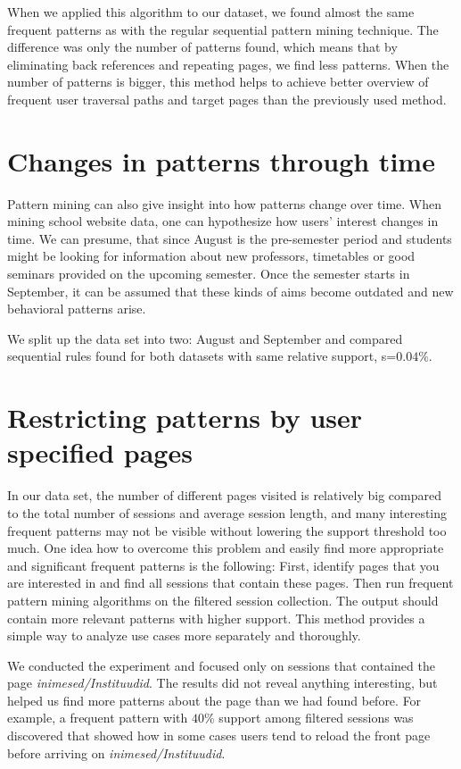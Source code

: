 \documentclass[12pt, english,a4paper]{article}
\begin{document}
When we applied this algorithm to our dataset, we found almost the same frequent patterns as with the regular sequential pattern mining technique. The difference was only the number of patterns found, which means that by eliminating back references and repeating pages, we find less patterns. When the number of patterns is bigger, this method helps to achieve better overview of frequent user traversal paths and target pages than the previously used method.

\section{Changes in patterns through time} 
Pattern mining can also give insight into how patterns change over time. When mining school website data, one can hypothesize how users' interest changes in time. We can presume, that since August is the pre-semester period and students might be looking for information about new professors, timetables or good seminars provided on the upcoming semester. Once the semester starts in September, it can be assumed that these kinds of aims become outdated and new behavioral patterns arise.

We split up the data set into two: August and September and compared sequential rules found for both datasets with same relative support, s=$0.04\%$.


\section{Restricting patterns by user specified pages}

In our data set, the number of different pages visited is relatively big compared to the total number of sessions and average session length, and many interesting frequent patterns may not be visible without lowering the support threshold too much. One idea how to overcome this problem and easily find more appropriate and significant frequent patterns is the following: First, identify pages that you are interested in and find all sessions that contain these pages. Then run frequent pattern mining algorithms on the filtered session collection. The output should contain more relevant patterns with higher support. This method provides a simple way to analyze use cases more separately and thoroughly.

We conducted the experiment and focused only on sessions that contained the page \emph{inimesed/Instituudid}. The results did not reveal anything interesting, but helped us find more patterns about the page than we had found before. For example, a frequent pattern with $40\%$ support among filtered sessions was discovered that showed how in some cases users tend to reload the front page before arriving on \emph{inimesed/Instituudid}.
\end{document}
